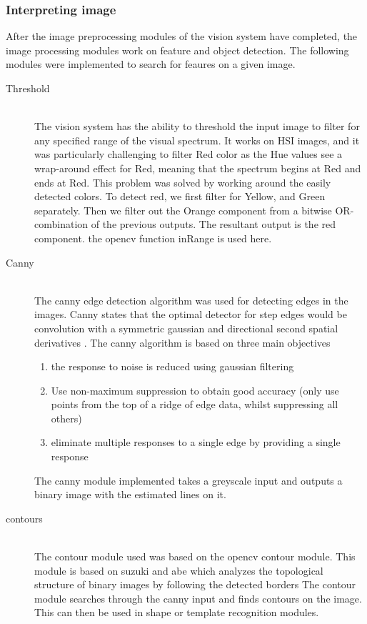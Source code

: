 \subsubsection{Interpreting image} 
After the image preprocessing modules of the vision system have completed, the image processing modules work on feature and object detection. The following modules were implemented to search for feaures on a given image. 
\begin{description}
\item[Threshold]\hfill \\
The vision system has the ability to threshold the input image to filter for any specified range of the visual spectrum. 
It works on HSI images, and it was particularly challenging to filter Red color as the Hue values see a wrap-around effect for Red, meaning that the spectrum begins at Red and ends at Red.
This problem was solved by working around the easily detected colors.
To detect red, we first filter for Yellow, and Green separately. Then we filter out the Orange component from a bitwise OR-combination of the previous outputs. The resultant output is the red component.
the opencv function inRange is used here.

\item[Canny]\hfill \\
The canny edge detection algorithm \cite{Canny:1986:CAE:11274.11275}  was used for detecting edges in the images. Canny states that the optimal detector for step edges would be convolution with a symmetric gaussian and directional second spatial derivatives \cite{books/sp/Cipolla96}. The canny algorithm is based on three main objectives \cite{Nixon:2008:FEI:1571711}
\begin{enumerate}
  \item the response to noise is reduced using gaussian filtering
  \item Use non-maximum suppression to obtain good accuracy (only use points from the top of a ridge of edge data, whilst suppressing all others)
  \item eliminate multiple responses to a single edge by providing a single response
\end{enumerate}

The canny module implemented takes a greyscale input and outputs a binary image with the estimated lines on it.

\item[contours]\hfill \\
The contour module used was based on the opencv contour module. This module is based on suzuki and abe which analyzes the topological structure of binary
images by following the detected borders \cite{article:suzuki} 
The contour module searches through the canny input and finds contours on the image. This can then be used in shape or template recognition modules.


\end{description}
